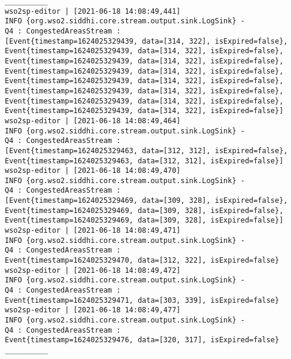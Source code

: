 \begin{lstlisting}
__________
wso2sp-editor | [2021-06-18 14:08:49,441]  
INFO {org.wso2.siddhi.core.stream.output.sink.LogSink} - 
Q4 : CongestedAreasStream : 
[Event{timestamp=1624025329439, data=[314, 322], isExpired=false}, 
Event{timestamp=1624025329439, data=[314, 322], isExpired=false}, 
Event{timestamp=1624025329439, data=[314, 322], isExpired=false}, 
Event{timestamp=1624025329439, data=[314, 322], isExpired=false}, 
Event{timestamp=1624025329439, data=[314, 322], isExpired=false}, 
Event{timestamp=1624025329439, data=[314, 322], isExpired=false}, 
Event{timestamp=1624025329439, data=[314, 322], isExpired=false}, 
Event{timestamp=1624025329439, data=[314, 322], isExpired=false}]
wso2sp-editor | [2021-06-18 14:08:49,464]  
INFO {org.wso2.siddhi.core.stream.output.sink.LogSink} - 
Q4 : CongestedAreasStream : 
[Event{timestamp=1624025329463, data=[312, 312], isExpired=false}, 
Event{timestamp=1624025329463, data=[312, 312], isExpired=false}]
wso2sp-editor | [2021-06-18 14:08:49,470]  
INFO {org.wso2.siddhi.core.stream.output.sink.LogSink} - 
Q4 : CongestedAreasStream : 
[Event{timestamp=1624025329469, data=[309, 328], isExpired=false}, 
Event{timestamp=1624025329469, data=[309, 328], isExpired=false}, 
Event{timestamp=1624025329469, data=[309, 328], isExpired=false}]
wso2sp-editor | [2021-06-18 14:08:49,471]  
INFO {org.wso2.siddhi.core.stream.output.sink.LogSink} - 
Q4 : CongestedAreasStream : 
Event{timestamp=1624025329470, data=[312, 322], isExpired=false}
wso2sp-editor | [2021-06-18 14:08:49,472]  
INFO {org.wso2.siddhi.core.stream.output.sink.LogSink} - 
Q4 : CongestedAreasStream : 
Event{timestamp=1624025329471, data=[303, 339], isExpired=false}
wso2sp-editor | [2021-06-18 14:08:49,477]  
INFO {org.wso2.siddhi.core.stream.output.sink.LogSink} - 
Q4 : CongestedAreasStream : 
Event{timestamp=1624025329476, data=[320, 317], isExpired=false}
__________
\end{lstlisting}